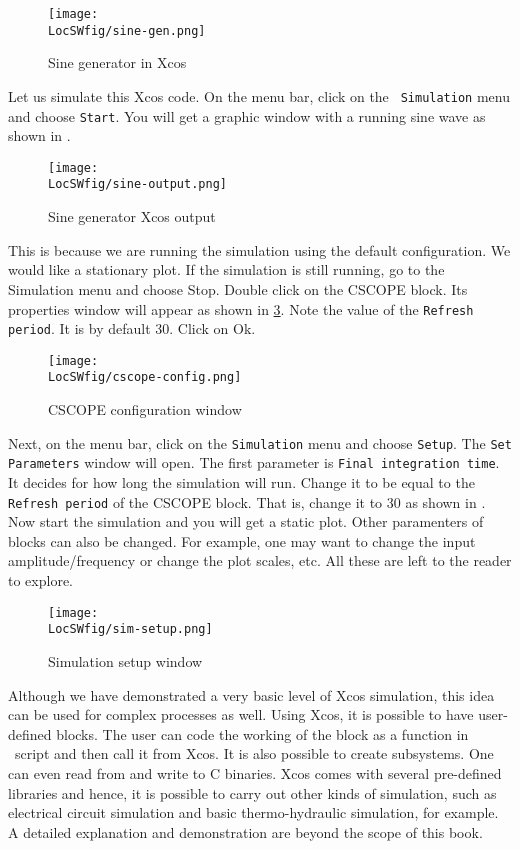 \begin{figure}
      \centering
      \texttt{[image: \\LocSWfig/sine-gen.png]}
      \caption{Sine generator in Xcos}
      \label{sine-gen}
\end{figure}

Let us simulate this Xcos code. On the menu bar, click on the {\tt
            Simulation} menu and choose {\tt Start}. You will get a graphic
window with a running sine wave as shown in .

\begin{figure}
      \centering
      \texttt{[image: \\LocSWfig/sine-output.png]}
      \caption{Sine generator Xcos output}
      \label{sine-output}
\end{figure}

This is because we are running the simulation using the default
configuration.  We would like a stationary plot.  If the simulation is
still running, go to the Simulation menu and choose Stop.  Double
click on the CSCOPE block. Its properties window will appear as shown
in \ref{cscope-config}. Note the value of the {\tt Refresh period}. It
is by default 30. Click on Ok.

\begin{figure}
      \centering
      \texttt{[image: \\LocSWfig/cscope-config.png]}
      \caption{CSCOPE configuration window}
      \label{cscope-config}
\end{figure}

Next, on the menu bar, click on the {\tt Simulation} menu and choose
      {\tt Setup}. The {\tt Set Parameters} window will open. The first
parameter is {\tt Final integration time}. It decides for how long the
simulation will run. Change it to be equal to the {\tt Refresh period}
of the CSCOPE block.  That is, change it to 30 as shown in
. Now start the simulation and you will get a static
plot.  Other paramenters of blocks can also be changed. For example,
one may want to change the input amplitude/frequency or change the
plot scales, etc. All these are left to the reader to explore.

\begin{figure}
      \centering
      \texttt{[image: \\LocSWfig/sim-setup.png]}
      \caption{Simulation setup window}
      \label{sim-setup}
\end{figure}

Although we have demonstrated a very basic level of Xcos simulation,
this idea can be used for complex processes as well.  Using Xcos, it
is possible to have user-defined blocks. The user can code the
working of the block as a function in \scilab\ script and then call it
from Xcos.  It is also possible to create subsystems.  
One can even read from and write to C binaries.  Xcos comes with
several pre-defined libraries and hence, it is possible to carry out
other kinds of simulation, such as electrical circuit simulation and
basic thermo-hydraulic simulation, for example.  A detailed 
explanation and demonstration are beyond the scope of this book.


